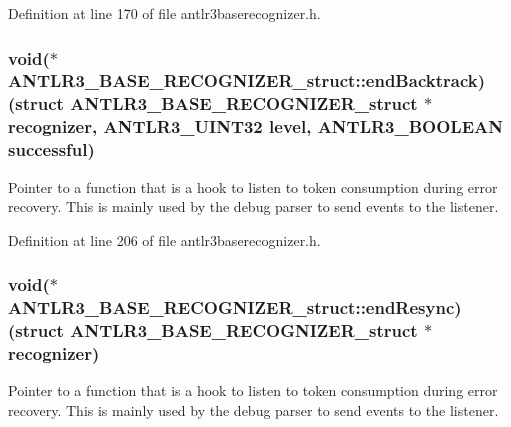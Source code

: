 Definition at line 170 of file antlr3baserecognizer.\-h.

\hypertarget{struct_a_n_t_l_r3___b_a_s_e___r_e_c_o_g_n_i_z_e_r__struct_aceb67f83ec3eb1ff97e4bc858aa29895}{
\subsubsection[{end\-Backtrack}]{\setlength{\rightskip}{0pt plus 5cm}void($\ast$ A\-N\-T\-L\-R3\-\_\-\-B\-A\-S\-E\-\_\-\-R\-E\-C\-O\-G\-N\-I\-Z\-E\-R\-\_\-struct\-::end\-Backtrack)(struct {\bf A\-N\-T\-L\-R3\-\_\-\-B\-A\-S\-E\-\_\-\-R\-E\-C\-O\-G\-N\-I\-Z\-E\-R\-\_\-struct} $\ast${\bf recognizer}, {\bf A\-N\-T\-L\-R3\-\_\-\-U\-I\-N\-T32} {\bf level}, {\bf A\-N\-T\-L\-R3\-\_\-\-B\-O\-O\-L\-E\-A\-N} successful)}}\label{struct_a_n_t_l_r3___b_a_s_e___r_e_c_o_g_n_i_z_e_r__struct_aceb67f83ec3eb1ff97e4bc858aa29895}
Pointer to a function that is a hook to listen to token consumption during error recovery. This is mainly used by the debug parser to send events to the listener. 

Definition at line 206 of file antlr3baserecognizer.\-h.

\hypertarget{struct_a_n_t_l_r3___b_a_s_e___r_e_c_o_g_n_i_z_e_r__struct_a7d9ce595456fe55916d36d9714011294}{
\subsubsection[{end\-Resync}]{\setlength{\rightskip}{0pt plus 5cm}void($\ast$ A\-N\-T\-L\-R3\-\_\-\-B\-A\-S\-E\-\_\-\-R\-E\-C\-O\-G\-N\-I\-Z\-E\-R\-\_\-struct\-::end\-Resync)(struct {\bf A\-N\-T\-L\-R3\-\_\-\-B\-A\-S\-E\-\_\-\-R\-E\-C\-O\-G\-N\-I\-Z\-E\-R\-\_\-struct} $\ast${\bf recognizer})}}\label{struct_a_n_t_l_r3___b_a_s_e___r_e_c_o_g_n_i_z_e_r__struct_a7d9ce595456fe55916d36d9714011294}
Pointer to a function that is a hook to listen to token consumption during error recovery. This is mainly used by the debug parser to send events to the listener. 

